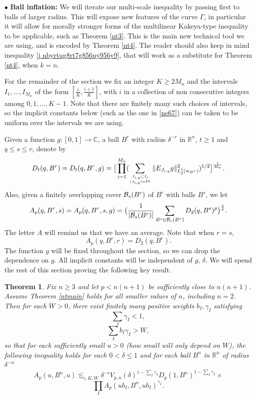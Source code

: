 \documentclass[amssymb,amsfonts,12pt]{amsart}
\newtheorem{theorem}{Theorem}[section]
\def\R{{\mathbb R}}
\def\C{{\mathbb C}}
\begin{document}
$\bullet$ \textbf{Ball inflation:} We will iterate our multi-scale inequality by passing first to balls of larger radius. This will expose new features of the curve $\Gamma$, in particular it will allow for morally stronger forms of the multilinear Kakeya-type inequality to be applicable, such as Theorem \ref{nt3}. This is the main new technical tool we are using, and is encoded by Theorem \ref{nt4}. The reader should also keep in mind inequality \eqref{j nbyrtug8rt7g856uy956y9}, that will work as a substitute for Theorem \ref{nt4}, when $k=n$.
\bigskip

For the remainder of the section we fix an integer $K\ge 2M_n$ and the intervals
$I_1,\ldots,I_{M_n}$ of the form $[\frac{i}{K},\frac{i+1}{K}]$, with $i$ in a collection of non consecutive integers among $0,1,\ldots,K-1$. Note that there are finitely many such choices of intervals, so the implicit constants below (such as the one in  \eqref{ne67}) can be taken to be uniform over the intervals we are using.
\bigskip


Given a function $g:[0,1]\to\C$, a ball $B^r$ with radius $\delta^{-r}$ in $\R^n$, $t\ge 1$ and $q\le s \le r$, denote by
$$D_t(q,B^r)=D_t(q,B^r,g)=\big[\prod_{i=1}^{M_n}(\sum_{J_{i,q}\subset I_i\atop{|J_{i,q}|=\delta^q}}\|E_{J_{i,q}}g\|_{L^{t}_{\sharp}(w_{B^r})}^2)^{1/2}\big]^{\frac{1}{M_n}
}.$$
Also, given a finitely overlapping cover ${\mathcal B}_s(B^r)$ of  $B^r$ with balls $B^s$, we let
$$A_p(q,B^r,s)=A_p(q,B^r,s,g)=\big(\frac1{|{\mathcal B}_s(B^r)|}\sum_{B^s\in{\mathcal B}_s(B^r)}D_2(q,B^s)^p\big)^{\frac1p}.$$
The letter $A$ will remind us that we have an average.  Note that when $r=s$,
$$A_p(q,B^r,r)=D_2(q,B^r).$$
The function $g$ will be fixed throughout the section, so we can drop the dependence on $g$. All implicit constants will be independent of $g$, $\delta$. We will spend the rest of this section proving the following key result.

\begin{theorem}
\label{nt27}Fix $n\ge 3$ and let $p<n(n+1)$ be sufficiently close to $n(n+1)$. Assume Theorem \ref{ntmain} holds for all smaller values of $n$, including $n=2$. Then for each $W>0$, there exist finitely many  positive weights $b_I,\gamma_I$ satisfying
$$\sum_I\gamma_I<1,$$
$$\sum_Ib_I\gamma_I>W,$$
so that for each sufficiently small $u>0$ (how small will only depend on $W$), the following inequality holds for each $0<\delta\le 1$ and for each ball $B^n$ in $\R^n$ of radius $\delta^{-n}$
\begin{equation}
\label{ne67}
A_p(u,B^n,u)\lesssim_{\epsilon,K,W}\delta^{-\epsilon}V_{p,n}(\delta)^{1-\sum_I\gamma_I}D_p(1,B^n)^{1-\sum_I\gamma_I}\times
\end{equation}
$$\prod_{I}A_p(ub_I,B^n,ub_I)^{\gamma_I}.$$
\end{theorem}
\end{document}
